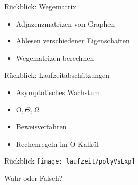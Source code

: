 






\graphicspath{{../figures/}}




\framePrevEpisode

\begin{frame}{Rückblick: Wegematrix}
	\begin{itemize}[<+->]
		\item Adjazenzmatrizen von Graphen
		\item Ablesen verschiedener Eigenschaften
		\item Wegematrizen berechnen
	\end{itemize}
\end{frame}

\begin{frame}{Rückblick: Laufzeitabschätzungen}
	\begin{itemize}[<+->]
		\item Asymptotisches Wachstum
		\item O$, \Theta, \Omega$
		\item Beweisverfahren
		\item Rechenregeln im O-Kalkül
	\end{itemize}
\end{frame}

\begin{frame}{Rückblick}
	\centering
	\texttt{[image: laufzeit/polyVsExp]}
\end{frame}

\begin{frame}{Wahr oder Falsch?}
	\begin{itemize}
			\end{itemize}
\end{frame}

